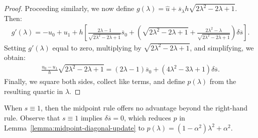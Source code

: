 \documentclass{article}
\begin{document}
\begin{proof}
  Proceeding similarly, we now define
  $g(\lambda) = \hat{u} + \overline{s}_\lambda h \sqrt{2 \lambda^2 -
    2\lambda + 1}$. Then:
  \begin{align*}
    g'(\lambda) = -u_0 + u_1 + h \left[\frac{2\lambda - 1}{\sqrt{2\lambda^2 - 2\lambda + 1}} \overline{s}_0 + \left(\sqrt{2\lambda^2 - 2\lambda + 1} + \frac{2\lambda^2 - \lambda}{\sqrt{2\lambda^2 - 2\lambda + 1}}\right)\delta \overline{s}\right].
  \end{align*}
  Setting $g'(\lambda)$ equal to zero, multiplying by
  $\sqrt{2\lambda^2 - 2\lambda +1}$, and simplifying, we obtain:
  \begin{align*}
    \frac{u_0 - u_1}{h} \sqrt{2\lambda^2 - 2\lambda + 1} = {(2\lambda - 1)}\overline{s}_0 + {(4\lambda^2 - 3\lambda + 1)} \delta \overline{s}.
  \end{align*}
  Finally, we square both sides, collect like terms, and define
  $p(\lambda)$ from the resulting quartic in $\lambda$.
\end{proof}

\begin{note}
  When $s \equiv 1$, then the midpoint rule offers no advantage beyond
  the right-hand rule. Observe that $s \equiv 1$ implies
  $\delta \overline{s} = 0$, which reduces $p$ in
  Lemma~\ref{lemma:midpoint-diagonal-update} to
  $p(\lambda) = (1 - \alpha^2) \lambda^2 + \alpha^2$. 
\end{note}
\end{document}
